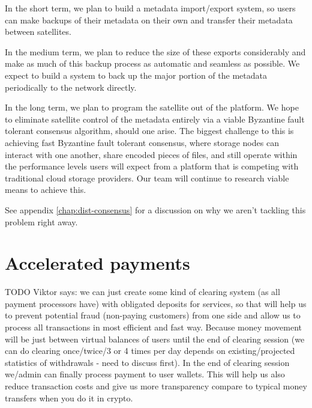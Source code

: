 \documentclass[11pt,fleqn,openany]{book}
\newcommand{\todo}[1]{{\color{red} TODO #1 }}
\begin{document}
In the short term, we plan to build a metadata import/export system, so users
can make backups of their metadata on their own and transfer their metadata
between satellites.

In the medium term, we plan to reduce the size of these exports considerably
and make as much of this backup process as automatic and seamless as possible.
We expect to build a system to back up the major portion of the metadata
periodically to the network directly.

In the long term, we plan to program the satellite out of the platform.
We hope to eliminate satellite control of the metadata
entirely via a viable Byzantine fault tolerant consensus algorithm, should
one arise.
The biggest challenge to this is achieving fast Byzantine fault tolerant
consensus, where storage nodes can interact with one another, share encoded
pieces of files, and still operate within the performance levels users will
expect from a platform that is competing with traditional cloud storage
providers. Our team will continue to research viable means to achieve this.

See appendix \ref{chap:dist-consensus} for a discussion on why
we aren't tackling this problem right away.

\section{Accelerated payments}

\todo{Viktor says:
we can just create some kind of clearing system (as all payment processors have) with obligated deposits for services, so that will help us to prevent potential fraud (non-paying customers) from one side and allow us to process all transactions in most efficient and fast way. Because money movement will be just between virtual balances of users until the end of clearing session (we can do clearing once/twice/3 or 4 times per day depends on existing/projected statistics of withdrawals - need to discuss first). In the end of clearing session we/admin can finally process payment to user wallets. This will help us also reduce transaction costs and give us more transparency compare to typical money transfers when you do it in crypto.
}
\end{document}
